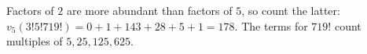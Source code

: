 Factors of $2$ are more abundant than factors of $5$, so count the latter: $v_5(3!5!719!)=0+1+143+28+5+1=\boxed{178}$. The terms for $719!$ count multiples of $5,25,125,625$.
